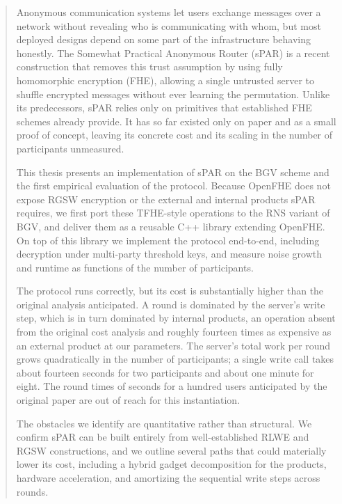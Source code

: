 \pagestyle{empty}
\begin{abstract}
\noindent Anonymous communication systems let users exchange messages over a network without revealing who is communicating with whom, but most deployed designs depend on some part of the infrastructure behaving honestly. The Somewhat Practical Anonymous Router (sPAR) is a recent construction that removes this trust assumption by using fully homomorphic encryption (FHE), allowing a single untrusted server to shuffle encrypted messages without ever learning the permutation. Unlike its predecessors, sPAR relies only on primitives that established FHE schemes already provide. It has so far existed only on paper and as a small proof of concept, leaving its concrete cost and its scaling in the number of participants unmeasured.

This thesis presents an implementation of sPAR on the BGV scheme and the first empirical evaluation of the protocol. Because OpenFHE does not expose RGSW encryption or the external and internal products sPAR requires, we first port these TFHE-style operations to the RNS variant of BGV, and deliver them as a reusable C++ library extending OpenFHE. On top of this library we implement the protocol end-to-end, including decryption under multi-party threshold keys, and measure noise growth and runtime as functions of the number of participants.

The protocol runs correctly, but its cost is substantially higher than the original analysis anticipated. A round is dominated by the server's write step, which is in turn dominated by internal products, an operation absent from the original cost analysis and roughly fourteen times as expensive as an external product at our parameters. The server's total work per round grows quadratically in the number of participants; a single write call takes about fourteen seconds for two participants and about one minute for eight. The round times of seconds for a hundred users anticipated by the original paper are out of reach for this instantiation.

The obstacles we identify are quantitative rather than structural. We confirm sPAR can be built entirely from well-established RLWE and RGSW constructions, and we outline several paths that could materially lower its cost, including a hybrid gadget decomposition for the products, hardware acceleration, and amortizing the sequential write steps across rounds.
\end{abstract}
\cleardoublepage
\resetlanguage
